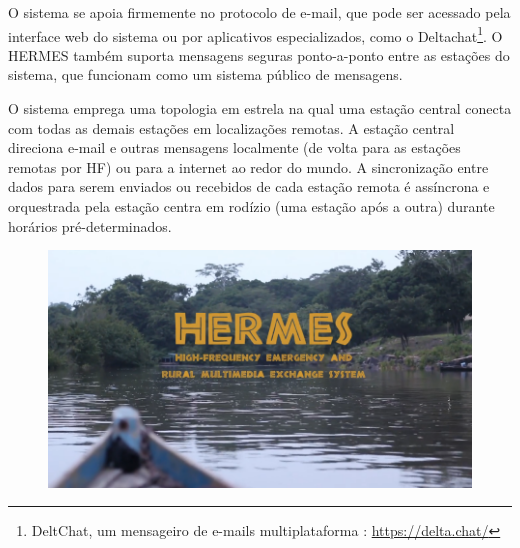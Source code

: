 \documentclass[11pt,a4paper]{article}
\begin{document}

O sistema se apoia firmemente no protocolo de e-mail, que pode ser acessado pela interface web do sistema ou por aplicativos especializados, como o Deltachat\footnote{DeltChat, um mensageiro de e-mails multiplataforma : \url{https://delta.chat/}}. O HERMES também suporta mensagens seguras ponto-a-ponto entre as estações do sistema, que funcionam como um sistema público de mensagens. 


O sistema emprega uma topologia em estrela na qual uma estação central conecta com todas as demais estações em localizações  remotas. A estação central direciona e-mail e outras mensagens localmente (de volta para as estações remotas por HF) ou para a internet ao redor do mundo. A sincronização entre dados para serem enviados ou recebidos de cada estação remota é assíncrona e orquestrada pela estação centra em rodízio (uma estação após a outra) durante horários pré-determinados.


\begin{figure}[!ht]
\includegraphics[width=1\textwidth]{pictures/hermes.png}
\end{figure}
\end{document}
